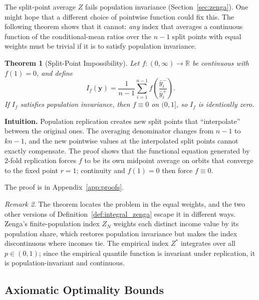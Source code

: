 \documentclass[12pt]{article}
\theoremstyle{plain}
\newtheorem{theorem}{Theorem}
\theoremstyle{definition}
\theoremstyle{remark}
\newtheorem{remark}[theorem]{Remark}
\newcommand{\R}{\mathbb{R}}
\newcommand{\bfy}{\mathbf{y}}
\begin{document}
The split-point average $Z$ fails population invariance (Section~\ref{sec:zenga}).
One might hope that a different choice of pointwise function could fix this.
The following theorem shows that it cannot: \emph{any} index that averages a continuous function of the conditional-mean ratios over the $n - 1$ split points with equal weights must be trivial if it is to satisfy population invariance.

\begin{theorem}[Split-Point Impossibility]\label{thm:zenga_impossibility}
Let $f : (0, \infty) \to \R$ be continuous with $f(1) = 0$, and define
\begin{equation}\label{eq:zenga_type}
I_f(\bfy) = \frac{1}{n-1}\sum_{i=1}^{n-1} f\!\left(\frac{\bar{y}_i^-}{\bar{y}_i^+}\right).
\end{equation}
If $I_f$ satisfies population invariance, then $f \equiv 0$ on $(0, 1]$, so $I_f$ is identically zero.
\end{theorem}

\textbf{Intuition.}
Population replication creates new split points that ``interpolate'' between the original ones.
The averaging denominator changes from $n-1$ to $kn-1$, and the new pointwise values at the interpolated split points cannot exactly compensate.
The proof shows that the functional equation generated by 2-fold replication forces $f$ to be its own midpoint average on orbits that converge to the fixed point $r = 1$; continuity and $f(1) = 0$ then force $f \equiv 0$.

The proof is in Appendix~\ref{app:proofs}.

\begin{remark}
The theorem locates the problem in the equal weights, and the two other versions of Definition~\ref{def:integral_zenga} escape it in different ways.
Zenga's finite-population index $Z_N$ weights each distinct income value by its population share, which restores population invariance but makes the index discontinuous where incomes tie.
The empirical index $Z^*$ integrates over all $p \in (0, 1)$; since the empirical quantile function is invariant under replication, it is population-invariant and continuous.
\end{remark}

\subsection{Axiomatic Optimality Bounds}\label{sec:optimality}
\end{document}
